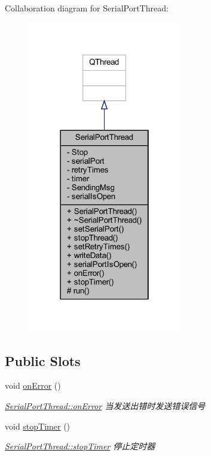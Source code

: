 Collaboration diagram for Serial\+Port\+Thread\+:
\nopagebreak
\begin{figure}[H]
\begin{center}
\leavevmode
\includegraphics[width=190pt]{class_serial_port_thread__coll__graph}
\end{center}
\end{figure}
\subsection*{Public Slots}
\begin{DoxyCompactItemize}
\item 
void \mbox{\hyperlink{class_serial_port_thread_a1f0e27279ed5e305f0f71caec3a835f8}{on\+Error}} ()
\begin{DoxyCompactList}\small\item\em \mbox{\hyperlink{class_serial_port_thread_a1f0e27279ed5e305f0f71caec3a835f8}{Serial\+Port\+Thread\+::on\+Error}} 当发送出错时发送错误信号 \end{DoxyCompactList}\item 
void \mbox{\hyperlink{class_serial_port_thread_adfceb467826dc0f59d0eb66c1ba0a1a6}{stop\+Timer}} ()
\begin{DoxyCompactList}\small\item\em \mbox{\hyperlink{class_serial_port_thread_adfceb467826dc0f59d0eb66c1ba0a1a6}{Serial\+Port\+Thread\+::stop\+Timer}} 停止定时器 \end{DoxyCompactList}\end{DoxyCompactItemize}
